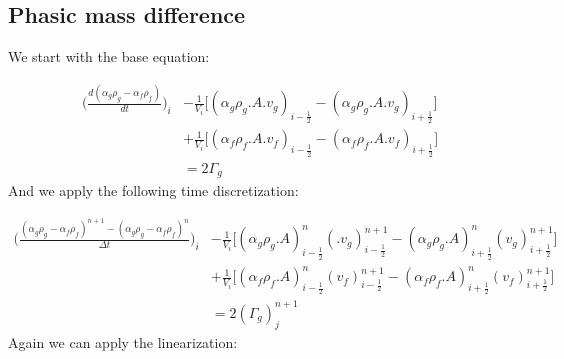 \documentclass[11pt,letterpaper,titlepage]{article}
\newcommand{\half}{\frac{1}{2}}
\begin{document}
\newpage
\subsection{Phasic mass difference}
We start with the base equation:

\begin{equation*}
\begin{aligned}
\biggr ( \frac{d(\alpha_g \rho_g-\alpha_f\rho_f)}{dt} \biggr )_i
&-\frac{1}{V_i}\biggr[ (\alpha_g\rho_g.A.v_g)_{i-\half}-(\alpha_g\rho_g.A.v_g)_{i+\half} \biggr]\\
&+ \frac{1}{V_i}\biggr[ (\alpha_f\rho_f.A.v_f)_{i-\half}-(\alpha_f\rho_f.A.v_f)_{i+\half} \biggr]\\
&=2\Gamma_g
\end{aligned}
\end{equation*}
\newline
\noindent
And we apply the following time discretization:

\begin{equation*}
\begin{aligned}
\biggr ( \frac{(\alpha_g \rho_g-\alpha_f\rho_f)^{n+1}-(\alpha_g \rho_g-\alpha_f\rho_f)^n}{\Delta t} \biggr )_i
&-\frac{1}{V_i}\biggr[(\alpha_g\rho_g.A)_{i-\half}^{n} (.v_g)_{i-\half}^{n+1}
-(\alpha_g\rho_g.A)_{i+\half}^{n} (v_g)_{i+\half}^{n+1} \biggr]\\
&+ \frac{1}{V_i}\biggr[(\alpha_f\rho_f.A)_{i-\half}^{n} (v_f)_{i-\half}^{n+1}
-(\alpha_f\rho_f.A)_{i+\half}^{n} (v_f)_{i+\half}^{n+1} \biggr]\\
&=2(\Gamma_g)_j^{n+1}
\end{aligned}
\end{equation*}
\newline 
\noindent Again we can apply the linearization:
\end{document}
